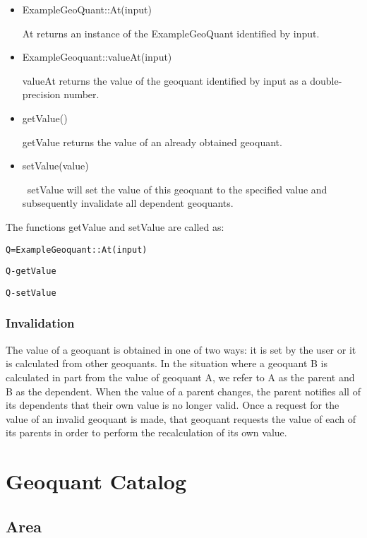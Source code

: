 \begin{itemize}
\item ExampleGeoQuant::At(input)

At returns an instance of the ExampleGeoQuant identified by input.

\item ExampleGeoquant::valueAt(input)

valueAt returns the value of the geoquant identified by input as a
double-precision number.

\item getValue()

getValue returns the value of an already obtained geoquant.

\item setValue(value)

\ setValue will set the value of this geoquant to the specified value and
subsequently invalidate all dependent geoquants.
\end{itemize}

The functions getValue and setValue are called as:

\texttt{Q=ExampleGeoquant::At(input)}

\texttt{Q-\TEXTsymbol{>}getValue}

\texttt{Q-\TEXTsymbol{>}setValue}

\subsubsection{Invalidation}

The value of a geoquant is obtained in one of two ways: it is set by the
user or it is calculated from other geoquants. In the situation where a
geoquant B is calculated in part from the value of geoquant A, we refer to A
as the parent and B as the dependent. When the value of a parent changes,
the parent notifies all of its dependents that their own value is no longer
valid. Once a request for the value of an invalid geoquant is made, that
geoquant requests the value of each of its parents in order to perform the
recalculation of its own value.

\section{Geoquant Catalog}

\subsection{Area}


